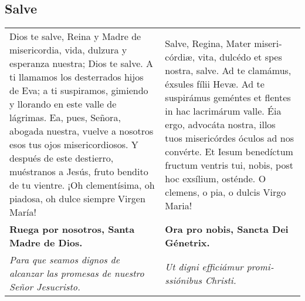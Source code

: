 \documentclass[./devocionario.tex]{subfiles}
\begin{document}
    \subsection*{Salve}
    \begin{tabular} { p{} p{} }
        Dios te salve, Reina y Madre de mi­se­ri­cordia, vida, dulzura y esperanza nuestra; Dios te salve. 
        A ti llamamos los desterrados hijos de Eva; a ti suspiramos, gimiendo y llorando en este valle de lágrimas. 
        Ea, pues, Señora, abogada nuestra, vuelve a nosotros esos tus ojos mi­se­ri­cordiosos. Y después de este destierro, muéstranos a Jesús, 
        fruto bendito de tu vientre. ¡Oh cle­men­tísima, oh piadosa, oh dulce siempre Virgen María!

        &

        Salve, Regina, Mater mi­se­ri­córdiæ, vita, dulcédo et spes nostra, salve. Ad te clamámus, éxsules fílii Hevæ. 
        Ad te suspirámus geméntes et flentes in hac lacrimárum valle. Éia ergo, advocáta nostra, illos tuos mi­se­ri­córdes óculos ad nos convérte. 
        Et Iesum benedíctum fructum ventris tui, nobis, post hoc exsílium, osténde. O clemens, o pia, o dulcis Virgo Maria!\\
        
        \textbf{Ruega por nosotros, Santa Madre de Dios.} & \textbf{Ora pro nobis, Sancta Dei Génetrix.}\\
        
        \textit{Para que seamos dignos de alcanzar las promesas de nuestro Señor Jesucristo.}

        &

        \textit{Ut digni efficiámur pro­mi­ssiónibus Christi.}
    \end{tabular}
    
\end{document}
